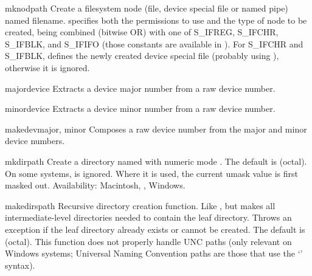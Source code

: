 \begin{funcdesc}{mknod}{path}
Create a filesystem node (file, device special file or named pipe)
named filename.  specifies both the permissions to use and
the type of node to be created, being combined (bitwise OR) with one
of S_IFREG, S_IFCHR, S_IFBLK, and S_IFIFO (those constants are
available in ). For S_IFCHR and S_IFBLK, 
defines the newly created device special file (probably using
), otherwise it is ignored.
\end{funcdesc}

\begin{funcdesc}{major}{device}
Extracts a device major number from a raw device number.
\end{funcdesc}

\begin{funcdesc}{minor}{device}
Extracts a device minor number from a raw device number.
\end{funcdesc}

\begin{funcdesc}{makedev}{major, minor}
Composes a raw device number from the major and minor device numbers.
\end{funcdesc}

\begin{funcdesc}{mkdir}{path}
Create a directory named  with numeric mode .
The default  is  (octal).  On some systems,
 is ignored.  Where it is used, the current umask value is
first masked out.
Availability: Macintosh, \UNIX, Windows.
\end{funcdesc}

\begin{funcdesc}{makedirs}{path}
Recursive directory creation function.
Like ,
but makes all intermediate-level directories needed to contain the
leaf directory.  Throws an  exception if the leaf
directory already exists or cannot be created.  The default 
is  (octal).  This function does not properly handle UNC
paths (only relevant on Windows systems; Universal Naming Convention
paths are those that use the `' syntax).
\end{funcdesc}

